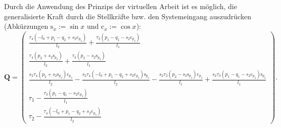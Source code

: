 Durch die Anwendung des Prinzips der virtuellen Arbeit ist es möglich, die generalisierte Kraft durch die Stellkräfte bzw. den Systemeingang auszudrücken (Abkürzungen $\mathrm{s}_x := \sin{x}$ und $\mathrm{c}_x := \cos{x}$):
\begin{equation}
\mathbf{Q}=
\left(\begin{smallmatrix}
\frac{\tau_{4} \left(- l_{0} + p_{1} - q_{2} + s_{2} \mathrm{c}_{p_{3}}\right)}{l_{2}} + \frac{\tau_{3} \left(p_{1} - q_{1} - s_{2} \mathrm{c}_{p_{3}}\right)}{l_{1}}\\
\frac{\tau_{4} \left(p_{2} + s_{2} \mathrm{s}_{p_{3}}\right)}{l_{2}} + \frac{\tau_{3} \left(p_{2} - s_{2} \mathrm{s}_{p_{3}}\right)}{l_{1}}\\
\frac{s_{2} \tau_{4} \left(p_{2} + s_{2} \mathrm{s}_{p_{3}}\right) \mathrm{c}_{p_{3} }}{l_{2}} - \frac{s_{2} \tau_{4} \left(- l_{0} + p_{1} - q_{2} + s_{2} \mathrm{c}_{p_{3} }\right) \mathrm{s}_{p_{3}}}{l_{2}} - \frac{s_{2} \tau_{3} \left(p_{2} - s_{2} \mathrm{s}_{p_{3}}\right) \mathrm{c}_{p_{3}}}{l_{1}} + \frac{s_{2} \tau_{3} \left(p_{1} - q_{1} - s_{2} \mathrm{c}_{p_{3}}\right) \mathrm{s}_{p_{3}}}{l_{1}}\\
\tau_{1} - \frac{\tau_{3} \left(p_{1} - q_{1} - s_{2} \mathrm{c}_{p_{3} }\right)}{l_{1}}\\
\tau_{2} - \frac{\tau_{4} \left(- l_{0} + p_{1} - q_{2} + s_{2} \mathrm{c}_{p_{3} }\right)}{l_{2}}
\end{smallmatrix}\right).
\end{equation}

